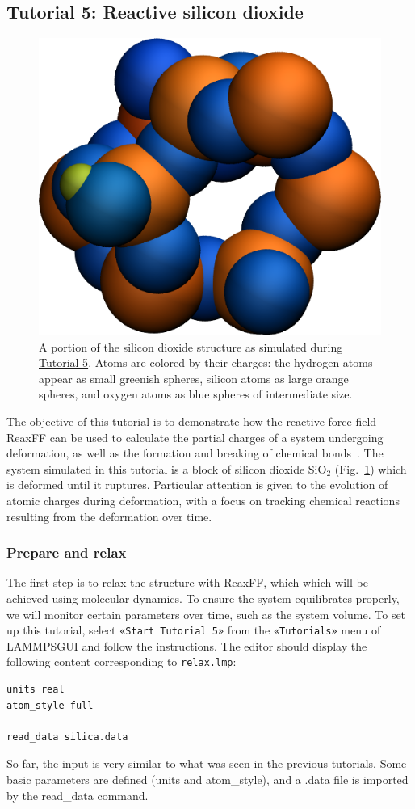 \documentclass[9pt,tutorial]{livecoms}
\newcommand{\lmpcmd}[1]{\colorbox{listing}{\textcolor{command}{\small{#1}}}} %
\newcommand{\flecmd}[1]{\textcolor{command}{\texttt{#1}}} %
\newcommand{\guicmd}[1]{\textcolor{command}{\texttt{«#1»}}} %
\newcommand{\lammpsgui}{\textsf{LAMMPS\textendash GUI}}
\begin{document}
\subsection{Tutorial 5: Reactive silicon dioxide}
\label{reactive-silicon-dioxide-label}

\begin{figure}
\centering
\includegraphics[width=0.55\linewidth]{SIO}
\caption{A portion of the silicon dioxide structure as simulated during
\hyperref[reactive-silicon-dioxide-label]{Tutorial 5}.  Atoms are colored
by their charges: the hydrogen atoms appear as small greenish spheres, silicon
atoms as large orange spheres, and oxygen atoms as blue spheres of intermediate
size.}
\label{fig:SIO}
\end{figure}

The objective of this tutorial is to demonstrate how the reactive force field ReaxFF
can be used to calculate the partial charges of a system undergoing deformation, as well as
the formation and breaking of chemical bonds~\cite{van2001reaxff, zou2012investigation}.
The system simulated in this tutorial is a block of silicon dioxide $\text{SiO}_2$ (Fig.~\ref{fig:SIO})
which is deformed until it ruptures.  Particular attention is given to the evolution
of atomic charges during deformation, with a focus on tracking chemical reactions
resulting from the deformation over time.

\subsubsection{Prepare and relax}

The first step is to relax the structure with ReaxFF, which which will be achieved using
molecular dynamics.  To ensure the system equilibrates properly, we will monitor certain
parameters over time, such as the system volume.  To set up this
tutorial, select \guicmd{Start Tutorial 5} from the
\guicmd{Tutorials} menu of \lammpsgui{} and follow the instructions.
The editor should display the following content corresponding to \flecmd{relax.lmp}:
\begin{lstlisting}
units real
atom_style full

read_data silica.data

\end{lstlisting}
So far, the input is very similar to what was seen in the previous tutorials.
Some basic parameters are defined (\lmpcmd{units} and \lmpcmd{atom\_style}),
and a \lmpcmd{.data} file is imported by the \lmpcmd{read\_data} command.
\end{document}

